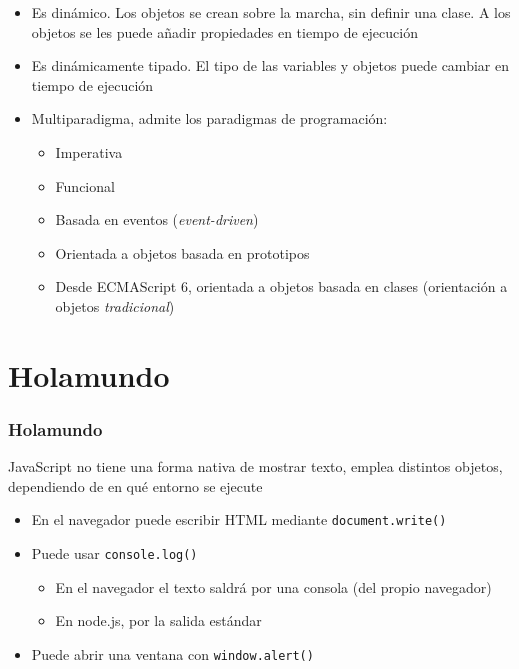 \documentclass[ucs]{beamer}
\begin{document}
\begin{frame}[fragile]

\begin{itemize}


\item
Es dinámico. Los objetos se crean sobre la marcha, sin definir una clase.
A los objetos se les puede añadir propiedades en tiempo de ejecución

\item
Es dinámicamente tipado.
El tipo de las variables y objetos puede cambiar en tiempo de ejecución

\item
Multiparadigma,
admite los paradigmas de programación:
\begin{itemize}
    \item
Imperativa

    \item
Funcional

    \item
Basada en eventos (\emph{event-driven})

    \item
Orientada a objetos basada en prototipos

    \item
Desde ECMAScript 6, orientada a objetos basada en clases (orientación a 
objetos \emph{tradicional}) 

\end{itemize}
\end{itemize}

\end{frame}


\section{Holamundo}

\begin{frame}[fragile]
\frametitle{Holamundo}
JavaScript no tiene una forma nativa de mostrar texto, emplea distintos
objetos, dependiendo de en qué entorno se ejecute

\begin{itemize}
\item
En el navegador puede escribir HTML mediante 
\verb|document.write()|

\item
Puede usar
\verb|console.log()|

    \begin{itemize}
    \item
En el navegador el texto saldrá por una consola (del propio navegador)
    \item
En node.js, por la salida estándar
    \end{itemize}

\item
Puede abrir una ventana con 
\verb|window.alert()|

\end{itemize}
\end{frame}
\end{document}
